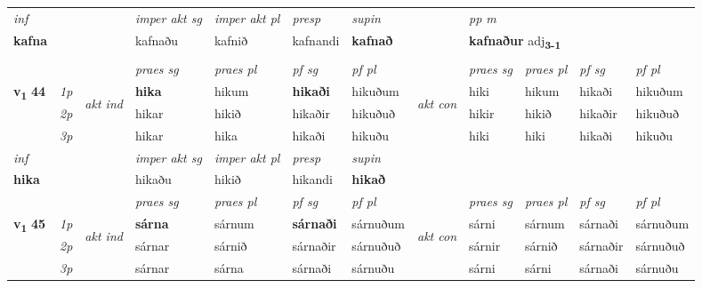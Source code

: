 \begin{longtable}[l]{X>{\footnotesize\itshape}llXXXXlXXXX}
   {\textit{inf}} & &  & \textit{imper akt sg} & \textit{imper akt pl}   & \textit{presp} & \textit{supin}  && \textit{pp m} \\*
  {\textbf{kafna}} & && kafnaðu  & kafnið   & kafnandi &  \textbf{kafnað}  && \multicolumn{2}{l}{\textbf{kafnaður} adj\textbf{\textsubscript{3-1}}} \\*

\midrule


& \\
\midrule

 & &   & \textit{praes sg}  & \textit{praes pl}    & \textit{ pf sg} & \textit{pf pl} & & \textit{praes sg}  & \textit{praes pl}    & \textit{pf sg} & \textit{pf pl }  \\ \cmidrule{4-7} \cmidrule{9-12}
 \multirow{2}{*}{{{\textbf{v{\textsubscript{1}}} \Large{\textbf{44}}}}}  & 1p & \multirow{3}{*}{\begin{turn}{90}\textit{akt ind}\end{turn}} & \textbf{hika} & hikum & \textbf{hikaði} & hikuðum & \multirow{3}{*}{\begin{turn}{90}\textit{akt con}\end{turn}} &hiki & hikum & hikaði & hikuðum\\*
 & 2p &  &  hikar  & hikið & hikaðir & hikuðuð & & hikir & hikið & hikaðir & hikuðuð \\*
 & 3p &  & hikar & hika & hikaði & hikuðu & & hiki & hiki& hikaði & hikuðu \\*
\cmidrule{4-7} \cmidrule{9-12}

   {\textit{inf}} & &  & \textit{imper akt sg} & \textit{imper akt pl}   & \textit{presp} & \textit{supin}   \\*
  {\textbf{hika}} & && hikaðu  & hikið   & hikandi &  \textbf{hikað}   \\*

\midrule

 & &   & \textit{praes sg}  & \textit{praes pl}    & \textit{ pf sg} & \textit{pf pl} & & \textit{praes sg}  & \textit{praes pl}    & \textit{pf sg} & \textit{pf pl }  \\ \cmidrule{4-7} \cmidrule{9-12}
 \multirow{2}{*}{{{\textbf{v{\textsubscript{1}}} \Large{\textbf{45}}}}}  & 1p & \multirow{3}{*}{\begin{turn}{90}\textit{akt ind}\end{turn}} & \textbf{sárna} & sárnum & \textbf{sárnaði} & sárnuðum & \multirow{3}{*}{\begin{turn}{90}\textit{akt con}\end{turn}} &sárni & sárnum & sárnaði & sárnuðum\\*
 & 2p &  &  sárnar  & sárnið & sárnaðir & sárnuðuð & & sárnir & sárnið & sárnaðir & sárnuðuð \\*
 & 3p &  & sárnar & sárna & sárnaði & sárnuðu & & sárni & sárni& sárnaði & sárnuðu \\*
\cmidrule{4-7} \cmidrule{9-12}


\end{longtable}
